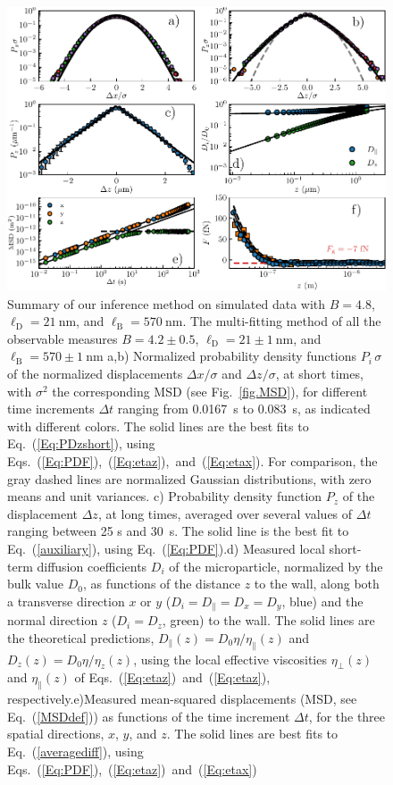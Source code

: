 \begin{figure}[H]
	\centering
	\includegraphics{02_body/chapter3/images/simulation_confined_Brownian_motion/method_sim.pdf}
	\caption{Summary of our inference method on simulated data with $B = 4.8$, $\ell_\mathrm{D} = 21 ~ \mathrm{nm}$, and $\ell_\mathrm{B} = 570~\mathrm{nm}$. The multi-fitting method of all the observable measures $B = 4.2 \pm 0.5$, $\ell_\mathrm{D} = 21\pm 1 ~ \mathrm{nm}$, and $\ell_\mathrm{B} = 570 \pm 1~\mathrm{nm}$  a,b) Normalized probability density functions $P_i\,\sigma$ of the normalized displacements $\Delta x/\sigma$ and $\Delta z/\sigma$, at short times, with $\sigma^2$ the corresponding MSD (see Fig.~\ref{fig.MSD}), for different time increments $\Delta t$ ranging from 0.0167~s to 0.083~s, as indicated with different colors. The solid lines are the best fits to Eq.~(\ref{Eq:PDzshort}), using Eqs.~(\ref{Eq:PDF}),~(\ref{Eq:etaz}),~and~(\ref{Eq:etax}). For comparison, the gray dashed lines are normalized Gaussian distributions, with zero means and unit variances. c) Probability density function $P_z$ of the displacement $\Delta z$, at long times, averaged over several values of $\Delta t$ ranging between 25 s and 30~s. The solid line is the best fit to Eq.~(\ref{auxiliary}), using Eq.~(\ref{Eq:PDF}).d) Measured local short-term diffusion coefficients $D_i$ of the microparticle, normalized by the bulk value $D_0$, as functions of the distance $z$ to the wall, along both a transverse direction $x$ or $y$ ($D_i=D_\parallel=D_x=D_y$, blue) and the normal direction $z$ ($D_i=D_z$, green) to the wall. The solid lines are the theoretical predictions, $D_{\parallel}(z)=D_0\eta/\eta_{\parallel}(z)$ and $D_z(z)=D_0\eta/\eta_z(z)$, using the local effective viscosities $\eta_{\bot}(z)$ and $\eta_\parallel(z)$ of Eqs.~(\ref{Eq:etaz})~and~(\ref{Eq:etaz}), respectively.e)Measured mean-squared displacements (MSD, see Eq.~(\ref{MSDdef})) as functions of the time increment $\Delta t$, for the three spatial directions, $x$, $y$, and $z$. The solid lines are best fits to Eq.~(\ref{averagediff}), using Eqs.~(\ref{Eq:PDF}),~(\ref{Eq:etaz})~and~(\ref{Eq:etax})
}
\end{figure}

